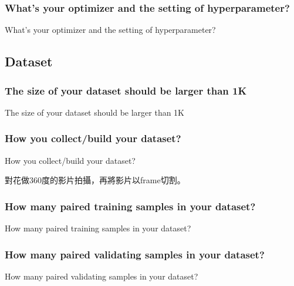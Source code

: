 \documentclass{beamer}
\begin{document}
\subsubsection{What's your optimizer and the setting of hyperparameter?  \bigskip \bigskip \bigskip \bigskip}
\begin{frame}{What's your optimizer and the setting of hyperparameter? }

\end{frame}


\subsection{Dataset}
\subsubsection{The size of your dataset should be larger than 1K}
\begin{frame}{The size of your dataset should be larger than 1K}

\end{frame}
\subsubsection{How you collect/build your dataset?}
\begin{frame}{How you collect/build your dataset?}
  \begin{CJK}{UTF8}{bkai}
	對花做360度的影片拍攝，再將影片以frame切割。
   \end{CJK}
\end{frame}

\subsubsection{How many paired training samples in your dataset?}
\begin{frame}{How many paired training samples in your dataset?}

\end{frame}

\subsubsection{How many paired validating samples in your dataset?}
\begin{frame}{How many paired validating samples in your dataset?}

\end{frame}
\end{document}

